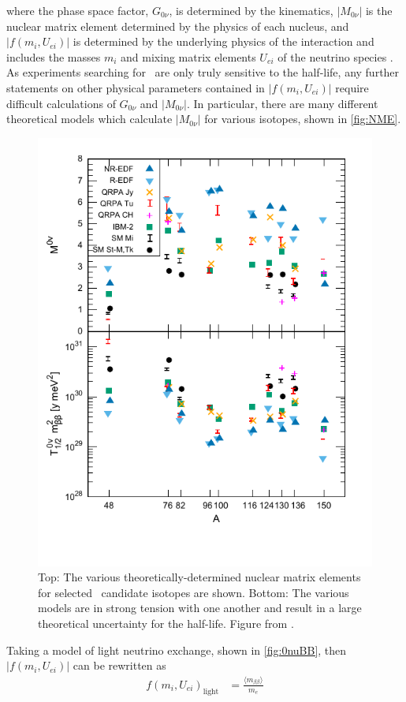 where the phase space factor, $G_{0\nu}$, is determined by the kinematics, $|M_{0\nu}|$ is the nuclear matrix element determined by the physics of each nucleus, and $|f(m_i, U_{ei})|$ is determined by the underlying physics of the interaction and includes the masses $m_i$ and mixing matrix elements $U_{ei}$ of the neutrino species \cite{Barea:2013bz}.
As experiments searching for \zeronubb~are only truly sensitive to the half-life, any further statements on other physical parameters contained in $|f(m_i, U_{ei})|$ require difficult calculations of $G_{0\nu}$ and $|M_{0\nu}|$.
In particular, there are many different theoretical models which calculate $|M_{0\nu}|$ for various isotopes, shown in \autoref{fig:NME}.
\begin{figure}[htbp]
    \centering
    \includegraphics[width=0.7\linewidth]{Figures/NMEversusA.pdf}
    \caption[The various theoretically-determined nuclear matrix elements for selected \zeronubb~candidate isotopes]
    {Top: The various theoretically-determined nuclear matrix elements for selected \zeronubb~candidate isotopes are shown.
    Bottom: The various models are in strong tension with one another and result in a large theoretical uncertainty for the half-life. Figure from \cite{Engel:NME}.}
    \label{fig:NME}
\end{figure}
Taking a model of light neutrino exchange, shown in \autoref{fig:0nuBB}, then $|f(m_i, U_{ei})|$ can be rewritten as
\begin{align}
        f(m_i, U_{ei})_{\textrm{light}} &= \frac{\langle m_{\beta\beta}\rangle}{m_e}
\end{align}
